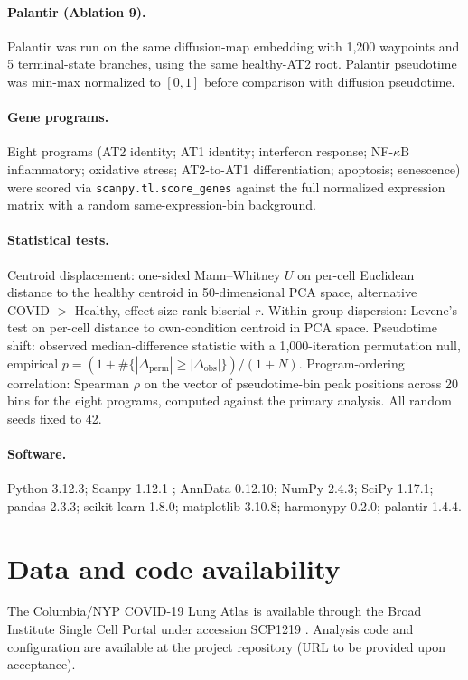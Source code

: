 \documentclass[11pt]{article}
\begin{document}
\paragraph{Palantir (Ablation 9).} Palantir \citep{Setty2019} was run on the same diffusion-map embedding with 1{,}200 waypoints and 5 terminal-state branches, using the same healthy-AT2 root. Palantir pseudotime was min-max normalized to $[0, 1]$ before comparison with diffusion pseudotime.

\paragraph{Gene programs.} Eight programs (AT2 identity; AT1 identity; interferon response; NF-$\kappa$B inflammatory; oxidative stress; AT2-to-AT1 differentiation; apoptosis; senescence) were scored via \texttt{scanpy.tl.score\_genes} against the full normalized expression matrix with a random same-expression-bin background.

\paragraph{Statistical tests.} Centroid displacement: one-sided Mann--Whitney $U$ on per-cell Euclidean distance to the healthy centroid in 50-dimensional PCA space, alternative COVID $>$ Healthy, effect size rank-biserial $r$. Within-group dispersion: Levene's test on per-cell distance to own-condition centroid in PCA space. Pseudotime shift: observed median-difference statistic with a 1{,}000-iteration permutation null, empirical $p = (1 + \#\{|\Delta_{\text{perm}}| \geq |\Delta_{\text{obs}}|\}) / (1 + N)$. Program-ordering correlation: Spearman $\rho$ on the vector of pseudotime-bin peak positions across 20 bins for the eight programs, computed against the primary analysis. All random seeds fixed to 42.

\paragraph{Software.} Python 3.12.3; Scanpy 1.12.1 \citep{Wolf2018}; AnnData 0.12.10; NumPy 2.4.3; SciPy 1.17.1; pandas 2.3.3; scikit-learn 1.8.0; matplotlib 3.10.8; harmonypy 0.2.0; palantir 1.4.4.

\section*{Data and code availability}

The Columbia/NYP COVID-19 Lung Atlas is available through the Broad Institute Single Cell Portal under accession SCP1219 \citep{Melms2021}. Analysis code and configuration are available at the project repository (URL to be provided upon acceptance).
\end{document}
